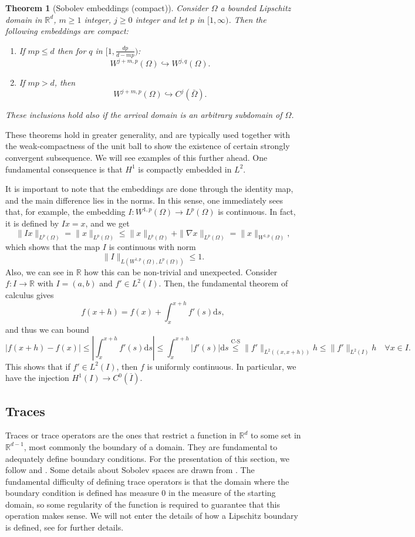 \documentclass{article}
\newcommand{\R}{\mathbb{R}}
\newtheorem{theorem}{Theorem}
\begin{document}
\begin{theorem}[Sobolev embeddings (compact)]
Consider $\Omega$ a bounded Lipschitz domain in $\R^d$, $m\geq 1$ integer, $j\geq 0$ integer and let $p$ in $[1,\infty)$. Then the following embeddings are compact:
    \begin{enumerate}
        \item If $mp \leq d$  then for $q$ in $[1, \frac{dp}{d - mp})$:
            $$ W^{j+m, p}(\Omega) \hookrightarrow W^{j,q}(\Omega). $$
        \item If $mp > d$, then 
            $$ W^{j+m, p}(\Omega) \hookrightarrow C^j(\bar\Omega). $$
    \end{enumerate}
These inclusions hold also if the arrival domain is an arbitrary subdomain of $\Omega$. 
\end{theorem}
These theorems hold in greater generality, and are typically used together with the weak-compactness of the unit ball to show the existence of certain strongly convergent subsequence. We will see examples of this further ahead. One fundamental consequence is that $H^1$ is compactly embedded in $L^2$.

It is important to note that the embeddings are done through the identity map, and the main difference lies in the norms. In this sense, one immediately sees that, for example, the embedding $I:W^{1,p}(\Omega)\to L^p(\Omega)$ is continuous. In fact, it is defined by $Ix=x$, and we get
$$
\|Ix\|_{L^p(\Omega)} = \|x\|_{L^p(\Omega)} \leq \|x\|_{L^p(\Omega)} + \|\nabla x\|_{L^p(\Omega)} = \|x\|_{W^{1,p}(\Omega)},
$$
which shows that the map $I$ is continuous with norm 
$$\|I\|_{L(W^{1,p}(\Omega), L^p(\Omega))}\leq 1.$$
Also, we can see in $\R$ how this can be non-trivial and unexpected. Consider $f:I\to \R$ with $I=(a,b)$ and $f'\in L^2(I)$. Then, the fundamental theorem of calculus gives
$$f(x+h) = f(x) + \int_x^{x+h}f'(s)\mathrm{d}s,$$
and thus we can bound
$$|f(x+h)-f(x)|\leq \left|\int_x^{x+h}f'(s)\mathrm{d}s\right|\leq \int_x^{x+h}|f'(s)|\mathrm{d}s \overset{\text{C-S}}{\leq} \|f'\|_{L^2((x,x+h))}h \leq \|f'\|_{L^2(I)}h \quad \forall x\in I. $$
This shows that if $f'\in L^2(I)$, then $f$ is uniformly continuous. In particular, we have the injection $H^1(I)\to C^0(\overline{I})$. 
\subsection{Traces}

Traces or trace operators are the ones that restrict a function in $\R^d$ to some set in $\R^{d-1}$, most commonly the boundary of a domain. They are fundamental to adequately define boundary conditions. For the presentation of this section, we follow \cite{gatica2014simple} and \cite{monk2003finite}. Some details about Sobolev spaces are drawn from \cite{adams2003sobolev}. The fundamental difficulty of defining trace operators is that the domain where the boundary condition is defined has measure 0 in the measure of the starting domain, so some regularity of the function is required to guarantee that this operation makes sense. We will not enter the details of how a Lipschitz boundary is defined, see \cite{monk2003finite} for further details.
\end{document}
